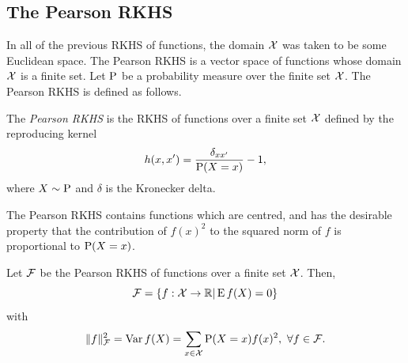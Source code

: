 \subsection{The Pearson RKHS}

In all of the previous RKHS of functions, the domain ${\mathcal X}$ was taken to be some Euclidean space. 
The Pearson RKHS is a vector space of functions whose domain ${\mathcal X}$ is a finite set.
Let $\operatorname{P}$ be a probability measure over the finite set ${\mathcal X}$. 
The Pearson RKHS is defined as follows.

\begin{definition}\label{def:pearson}
  The \emph{Pearson RKHS} is the RKHS of functions over a finite set ${\mathcal X}$ defined by the reproducing kernel
  \[
    h(x,x') = \frac{\delta_{xx'}}{\operatorname{P}(X=x)} - 1,
  \]
  where $X \sim \operatorname{P}$ and $\delta$ is the Kronecker delta.
\end{definition}

The Pearson RKHS contains functions which are centred, and has the desirable property that the contribution of $f(x)^2$ to the squared norm of $f$ is proportional to $\operatorname{P}(X=x)$.

\begin{claim}
  Let ${\mathcal F}$ be the Pearson RKHS of functions over a finite set ${\mathcal X}$.
  Then,
  \[
    {\mathcal F} = \{f:{\mathcal X}\to\mathbb{R} | \operatorname{E} f(X) = 0 \}
  \]
  with
  \[
    \lVert f\rVert_{\mathcal F}^2 = \operatorname{Var} f(X) = \sum_{x\in{\mathcal X}} \operatorname{P}(X=x)f(x)^2, \ \forall f \in {\mathcal F}.
  \]
\end{claim}

